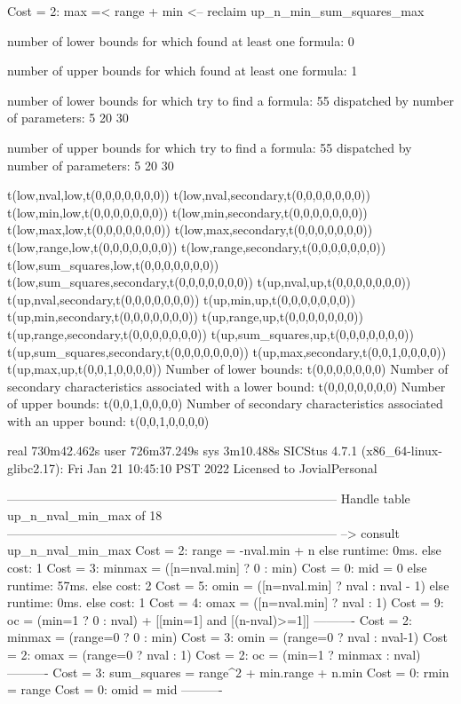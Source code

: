 Cost =  2:  max =< range + min
<-- reclaim up_n_min_sum_squares_max

number of lower bounds for which found at least one formula: 0

number of upper bounds for which found at least one formula: 1

number of lower bounds for which try to find a formula: 55
dispatched by number of parameters: 5  20  30

number of upper bounds for which try to find a formula: 55
dispatched by number of parameters: 5  20  30

t(low,nval,low,t(0,0,0,0,0,0,0))
t(low,nval,secondary,t(0,0,0,0,0,0,0))
t(low,min,low,t(0,0,0,0,0,0,0))
t(low,min,secondary,t(0,0,0,0,0,0,0))
t(low,max,low,t(0,0,0,0,0,0,0))
t(low,max,secondary,t(0,0,0,0,0,0,0))
t(low,range,low,t(0,0,0,0,0,0,0))
t(low,range,secondary,t(0,0,0,0,0,0,0))
t(low,sum_squares,low,t(0,0,0,0,0,0,0))
t(low,sum_squares,secondary,t(0,0,0,0,0,0,0))
t(up,nval,up,t(0,0,0,0,0,0,0))
t(up,nval,secondary,t(0,0,0,0,0,0,0))
t(up,min,up,t(0,0,0,0,0,0,0))
t(up,min,secondary,t(0,0,0,0,0,0,0))
t(up,range,up,t(0,0,0,0,0,0,0))
t(up,range,secondary,t(0,0,0,0,0,0,0))
t(up,sum_squares,up,t(0,0,0,0,0,0,0))
t(up,sum_squares,secondary,t(0,0,0,0,0,0,0))
t(up,max,secondary,t(0,0,1,0,0,0,0))
t(up,max,up,t(0,0,1,0,0,0,0))
Number of lower bounds:                                             t(0,0,0,0,0,0,0)
Number of secondary characteristics associated with a lower bound:  t(0,0,0,0,0,0,0)
Number of upper bounds:                                             t(0,0,1,0,0,0,0)
Number of secondary characteristics associated with an upper bound: t(0,0,1,0,0,0,0)

real	730m42.462s
user	726m37.249s
sys	3m10.488s
SICStus 4.7.1 (x86_64-linux-glibc2.17): Fri Jan 21 10:45:10 PST 2022
Licensed to JovialPersonal


--------------------------------------------------------------------------------
Handle table up_n_nval_min_max of 18
--------------------------------------------------------------------------------
--> consult up_n_nval_min_max
Cost =  2:  range       = -nval.min + n
else runtime: 0ms. else cost: 1
Cost =  3:  minmax      = ([n=nval.min] ? 0 : min) %
Cost =  0:  mid         = 0
else runtime: 57ms. else cost: 2
Cost =  5:  omin        = ([n=nval.min] ? nval : nval - 1) %
else runtime: 0ms. else cost: 1
Cost =  4:  omax        = ([n=nval.min] ? nval : 1) %
Cost =  9:  oc          = (min=1 ? 0 : nval) + [[min=1] and [(n-nval)>=1]] %
----------
Cost =  2:  minmax      = (range=0 ? 0 : min)
Cost =  3:  omin        = (range=0 ? nval : nval-1)
Cost =  2:  omax        = (range=0 ? nval : 1)
Cost =  2:  oc          = (min=1 ? minmax : nval)
----------
Cost =  3:  sum_squares = range^2 + min.range + n.min
Cost =  0:  rmin        = range
Cost =  0:  omid        = mid
----------

